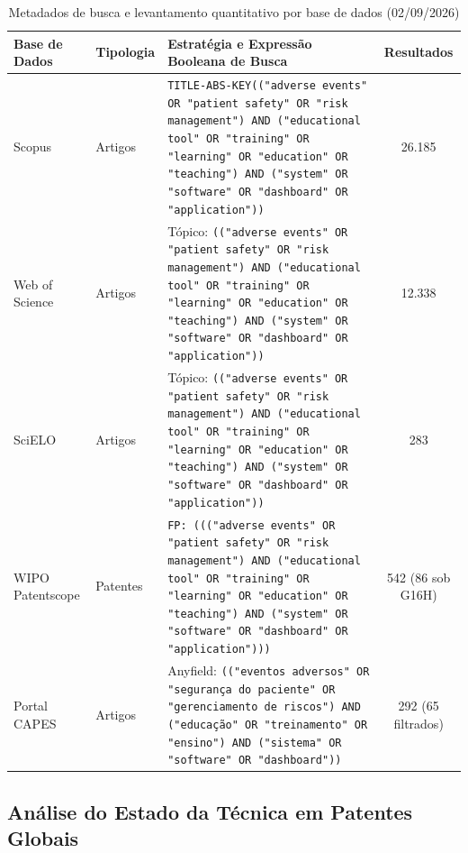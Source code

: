 \begin{table}[htbp]
\centering
\small
\caption{Metadados de busca e levantamento quantitativo por base de dados (02/09/2026)}
\label{tab:metadados-busca}
\begin{tabularx}{\textwidth}{>{\raggedright\arraybackslash}p{2.8cm} p{1.6cm} >{\raggedright\arraybackslash\scriptsize}X c}
\toprule
\textbf{Base de Dados} & \textbf{Tipologia} & \textbf{Estratégia e Expressão Booleana de Busca} & \textbf{Resultados} \\ 
\midrule
Scopus & Artigos & \texttt{TITLE-ABS-KEY(("adverse events" OR "patient safety" OR "risk management") AND ("educational tool" OR "training" OR "learning" OR "education" OR "teaching") AND ("system" OR "software" OR "dashboard" OR "application"))} & 26.185 \\ 
\midrule
Web of Science & Artigos & Tópico: \texttt{(("adverse events" OR "patient safety" OR "risk management") AND ("educational tool" OR "training" OR "learning" OR "education" OR "teaching") AND ("system" OR "software" OR "dashboard" OR "application"))} & 12.338 \\ 
\midrule
SciELO & Artigos & Tópico: \texttt{(("adverse events" OR "patient safety" OR "risk management") AND ("educational tool" OR "training" OR "learning" OR "education" OR "teaching") AND ("system" OR "software" OR "dashboard" OR "application"))} & 283 \\ 
\midrule
WIPO Patentscope & Patentes & \texttt{FP: ((("adverse events" OR "patient safety" OR "risk management") AND ("educational tool" OR "training" OR "learning" OR "education" OR "teaching") AND ("system" OR "software" OR "dashboard" OR "application")))} & 542 \newline (86 sob G16H) \\ 
\midrule
Portal CAPES & Artigos & Anyfield: \texttt{(("eventos adversos" OR "segurança do paciente" OR "gerenciamento de riscos") AND ("educação" OR "treinamento" OR "ensino") AND ("sistema" OR "software" OR "dashboard"))} & 292 \newline (65 filtrados) \\ 
\bottomrule
\end{tabularx}
\end{table}

\subsection{Análise do Estado da Técnica em Patentes Globais}
\label{subsec:analise-patentes-globais}

